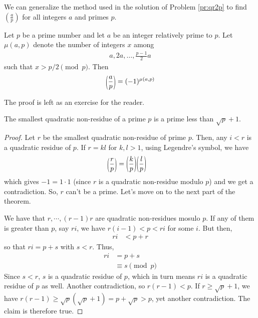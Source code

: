 \documentclass[main.tex]{subfile}
\begin{document}
We can generalize the method used in the solution of Problem \ref{pr:qr2p} to find $ \left(\frac{a}{p}\right)$ for all integers $a$ and primes $p$.
	\begin{theorem}\label{thm:gausscriterion}
		Let $p$ be a prime number and let $a$ be an integer relatively prime to $p$. Let $\mu(a,p)$ denote the number of integers $x$ among
		\begin{align*}
		a, 2a, \ldots, \frac{p-1}{2}a
		\end{align*}
		such that $x > p/2 \pmod p$. Then
		\begin{align*}
			\parenthesis{\dfrac{a}{p}} = (-1)^{\mu(a,p)}
		\end{align*}
	\end{theorem}

The proof is left as an exercise for the reader.
		\begin{theorem}
			The smallest quadratic non-residue of a prime $p$ is a prime less than $\sqrt{p}+1$.
		\end{theorem}

		\begin{proof}
			Let $r$ be the smallest quadratic non-residue of prime $p$. Then, any $i<r$ is a quadratic residue of $p$. If $r=kl$ for $k,l>1$, using Legendre's symbol, we have
			\begin{align*}
				\parenthesis{\dfrac{r}{p}} & = \parenthesis{\dfrac{k}{p}}\parenthesis{\dfrac{l}{p}}
			\end{align*}
			which gives $-1=1\cdot 1$ (since $r$ is a quadratic non-residue modulo $p$) and we get a contradiction. So, $r$ can't be a prime. Let's move on to the next part of the theorem.

			We have that $r,\cdots,(r-1)r$ are quadratic non-residues mosulo $p$. If any of them is greater than $p$, say $ri$, we have $r(i-1)<p<ri$ for some $i$. But then,
			\begin{align*}
				ri & < p+r
			\end{align*}
			so that $ri=p+s$ with $s<r$. Thus,
			\begin{align*}
				ri & = p+s\\
				& \equiv s\pmod p
			\end{align*}
			Since $s<r$, $s$ is a quadratic residue of $p$, which in turn means $ri$ is a quadratic residue of $p$ as well. Another contradiction, so $r(r-1)<p$. If $r\geq\sqrt{p}+1$, we have $r(r-1)\geq\sqrt{p}(\sqrt{p}+1)=p+\sqrt{p}>p$, yet another contradiction. The claim is therefore true.
		\end{proof}
\end{document}
